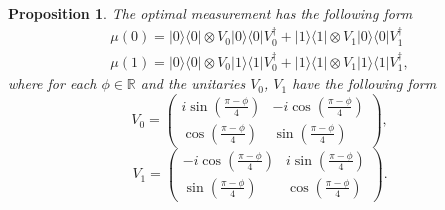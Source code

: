 \documentclass[preprint,12pt, a4paper]{elsarticle}
\newcommand{\ket}[1]{\ensuremath{|#1\rangle}}
\newcommand{\bra}[1]{\ensuremath{\langle#1|}}
\newcommand{\ketbra}[2]{\ensuremath{\ket{#1}\bra{#2}}}
\newcommand{\proj}[1]{\ensuremath{\ketbra{#1}{#1}}}
\newcommand{\1}{{\rm 1\hspace{-0.9mm}l}}
\newtheorem{proposition}{Proposition}
\begin{document}
\begin{proposition}
The  optimal measurement has the following form
\begin{equation}
\begin{split}
\mu(0) = \proj{0} \otimes V_0 \proj{0} V_0^\dagger +  \proj{1} \otimes V_1
\proj{0} V_1^\dagger  \\
\mu(1) = \proj{0} \otimes V_0 \proj{1} V_0^\dagger +  \proj{1} \otimes V_1
\proj{1} V_1^\dagger,
\end{split}
\end{equation}
where for each $\phi \in \mathbb{R}$ and  the unitaries $V_0$,  $V_1$
have the following form
\begin{equation}
V_0 = \left(\begin{array}{cc}i \sin\left( \frac{\pi - \phi}{4} \right)&-i
\cos\left( \frac{\pi - \phi}{4} \right)\\ \cos\left( \frac{\pi -
\phi}{4}\right)& \sin\left( \frac{\pi - \phi}{4} \right)\end{array}\right),
\end{equation}
\begin{equation}
V_1 = \left(\begin{array}{cc}-i \cos\left(\frac{\pi - \phi}{4}\right) &i
\sin\left( \frac{\pi - \phi}{4}\right)\\\sin\left( \frac{\pi - \phi}{4} \right)
&  \cos\left( \frac{\pi - \phi}{4} \right) \end{array}\right).
\end{equation}
\end{proposition}
\end{document}
